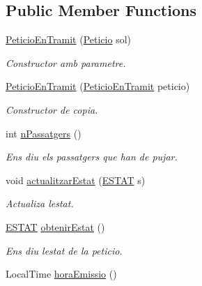 \subsection*{Public Member Functions}
\begin{DoxyCompactItemize}
\item 
\hyperlink{class_portam_a_pro_p_1_1_peticio_en_tramit_aa9d9149506e4fdc9b095a3a9871ce414}{Peticio\+En\+Tramit} (\hyperlink{class_portam_a_pro_p_1_1_peticio}{Peticio} sol)
\begin{DoxyCompactList}\small\item\em Constructor amb parametre. \end{DoxyCompactList}\item 
\hyperlink{class_portam_a_pro_p_1_1_peticio_en_tramit_a9b7bf21f0a66ecaebc948d4870aaeb80}{Peticio\+En\+Tramit} (\hyperlink{class_portam_a_pro_p_1_1_peticio_en_tramit}{Peticio\+En\+Tramit} peticio)
\begin{DoxyCompactList}\small\item\em Constructor de copia. \end{DoxyCompactList}\item 
int \hyperlink{class_portam_a_pro_p_1_1_peticio_en_tramit_a544db471b12c35d6b8c234be757d84d3}{n\+Passatgers} ()
\begin{DoxyCompactList}\small\item\em Ens diu els passatgers que han de pujar. \end{DoxyCompactList}\item 
void \hyperlink{class_portam_a_pro_p_1_1_peticio_en_tramit_aece10da9e278cb32d013f52b5b27544d}{actualitzar\+Estat} (\hyperlink{enum_portam_a_pro_p_1_1_peticio_en_tramit_1_1_e_s_t_a_t}{E\+S\+T\+AT} s)
\begin{DoxyCompactList}\small\item\em Actualiza l\textquotesingle{}estat. \end{DoxyCompactList}\item 
\hyperlink{enum_portam_a_pro_p_1_1_peticio_en_tramit_1_1_e_s_t_a_t}{E\+S\+T\+AT} \hyperlink{class_portam_a_pro_p_1_1_peticio_en_tramit_aa5d94375d300e485d8173fdfb1fc2bdd}{obtenir\+Estat} ()
\begin{DoxyCompactList}\small\item\em Ens diu l\textquotesingle{}estat de la peticio. \end{DoxyCompactList}\item 
Local\+Time \hyperlink{class_portam_a_pro_p_1_1_peticio_en_tramit_a21786731d8752541a29aacbd6756f26f}{hora\+Emissio} ()

\end{DoxyCompactItemize}
